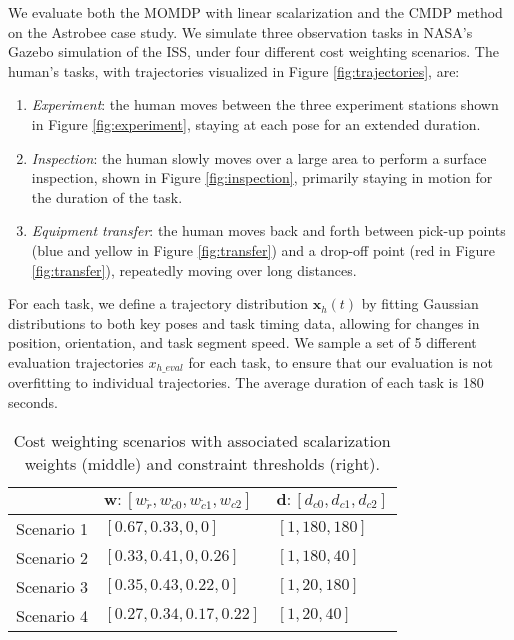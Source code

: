 \documentclass[letterpaper, 10 pt, conference]{ieeeconf}  %
\begin{document}
We evaluate both the MOMDP with linear scalarization and the CMDP method on the Astrobee case study.  We simulate three observation tasks in NASA's Gazebo simulation of the ISS, under four different cost weighting scenarios.  The human's tasks, with trajectories visualized in Figure \ref{fig:trajectories}, are:
\begin{enumerate}
  \item \textit{Experiment}: the human moves between the three experiment stations shown in Figure \ref{fig:experiment}, staying at each pose for an extended duration.
  \item \textit{Inspection}: the human slowly moves over a large area to perform a surface inspection, shown in Figure \ref{fig:inspection}, primarily staying in motion for the duration of the task.
  \item \textit{Equipment transfer}: the human moves back and forth between pick-up points (blue and yellow in Figure \ref{fig:transfer}) and a drop-off point (red in Figure \ref{fig:transfer}), repeatedly moving over long distances.
\end{enumerate}
For each task, we define a trajectory distribution $\mathbf{x}_h(t)$ by fitting Gaussian distributions to both key poses and task timing data, allowing for changes in position, orientation, and task segment speed.  We sample a set of 5 different evaluation trajectories $x_{h\_eval}$ for each task, to ensure that our evaluation is not overfitting to individual trajectories.  The average duration of each task is 180 seconds.

\begin{table}[t]
\caption{Cost weighting scenarios with associated scalarization weights (middle) and constraint thresholds (right).}
\label{tab:weights}
\begin{center}
\renewcommand{\arraystretch}{1.2}
\begin{tabular}{c|l|l}
 & $\mathbf{w}:[ w_{\tilde{r}}, w_{\tilde{c}0}, w_{\tilde{c}1}, w_{c2}]$ & $\mathbf{d}:[d_{c0}, d_{c1}, d_{c2}]$\\
\hline
Scenario 1 & $[0.67, 0.33, 0, 0]$ & $[1, 180, 180]$\\
Scenario 2 & $[0.33, 0.41, 0, 0.26]$ & $[1, 180, 40]$ \\
Scenario 3 & $[0.35, 0.43, 0.22, 0]$ & $[1, 20, 180]$ \\
Scenario 4 & $[0.27, 0.34, 0.17, 0.22]$ & $[1, 20, 40]$ \\
\end{tabular}
\end{center}
\vspace{-0.2cm}
\end{table}
\end{document}
